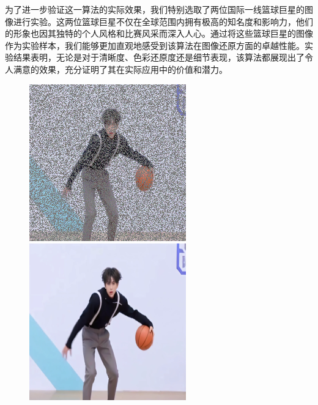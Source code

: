 为了进一步验证这一算法的实际效果，我们特别选取了两位国际一线篮球巨星的图像进行实验。这两位篮球巨星不仅在全球范围内拥有极高的知名度和影响力，他们的形象也因其独特的个人风格和比赛风采而深入人心。通过将这些篮球巨星的图像作为实验样本，我们能够更加直观地感受到该算法在图像还原方面的卓越性能。实验结果表明，无论是对于清晰度、色彩还原度还是细节表现，该算法都展现出了令人满意的效果，充分证明了其在实际应用中的价值和潜力。
\begin{figure}[H]
  \centering
  \begin{minipage}[b]{0.3\linewidth}
\includegraphics[width=\linewidth]{Picture/input/kun1_input.png}
  \end{minipage}
  \hspace{0.1cm} %
   \begin{minipage}[b]{0.3\linewidth}
    \includegraphics[width=\linewidth]{Picture/label/kun1_label.png}

\end{minipage}
\end{figure}

